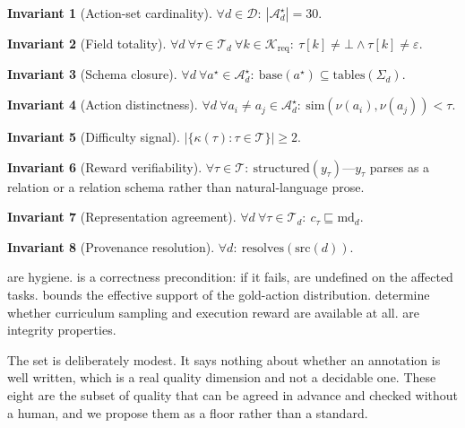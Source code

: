 \documentclass[11pt,letterpaper]{article}
\theoremstyle{definition}
\newtheorem{invariant}{Invariant}[section]
\theoremstyle{plain}
\theoremstyle{remark}
\newcommand{\Dset}{\mathcal{D}}
\newcommand{\Aset}{\mathcal{A}}
\newcommand{\Tset}{\mathcal{T}}
\newcommand{\Kset}{\mathcal{K}}
\begin{document}
\begin{invariant}[Action-set cardinality]\label{inv:1}
$\forall d \in \Dset:\ |\Aset^\star_d| = 30$.
\end{invariant}
\begin{invariant}[Field totality]\label{inv:2}
$\forall d\ \forall \tau \in \Tset_d\ \forall k \in \Kset_{\mathrm{req}}:\ \tau[k] \neq \bot \wedge \tau[k] \neq \varepsilon$.
\end{invariant}
\begin{invariant}[Schema closure]\label{inv:3}
$\forall d\ \forall a^\star \in \Aset^\star_d:\ \mathrm{base}(a^\star) \subseteq \mathrm{tables}(\Sigma_d)$.
\end{invariant}
\begin{invariant}[Action distinctness]\label{inv:4}
$\forall d\ \forall a_i \neq a_j \in \Aset^\star_d:\ \mathrm{sim}(\nu(a_i), \nu(a_j)) < \tau$.
\end{invariant}
\begin{invariant}[Difficulty signal]\label{inv:5}
$\left|\{\kappa(\tau) : \tau \in \Tset\}\right| \ge 2$.
\end{invariant}
\begin{invariant}[Reward verifiability]\label{inv:6}
$\forall \tau \in \Tset:\ \mathrm{structured}(y_\tau)$---$y_\tau$ parses as a relation or a
relation schema rather than natural-language prose.
\end{invariant}
\begin{invariant}[Representation agreement]\label{inv:7}
$\forall d\ \forall \tau \in \Tset_d:\ c_\tau \sqsubseteq \mathrm{md}_d$.
\end{invariant}
\begin{invariant}[Provenance resolution]\label{inv:8}
$\forall d:\ \mathrm{resolves}(\mathrm{src}(d))$.
\end{invariant}

 are hygiene.  is a correctness precondition: if it fails,
 are undefined on the affected tasks.  bounds the effective
support of the gold-action distribution.  determine whether curriculum
sampling and execution reward are available at all.  are integrity
properties.

The set is deliberately modest. It says nothing about whether an annotation is well written,
which is a real quality dimension and not a decidable one. These eight are the subset of
quality that can be agreed in advance and checked without a human, and we propose them as a
floor rather than a standard.
\end{document}
